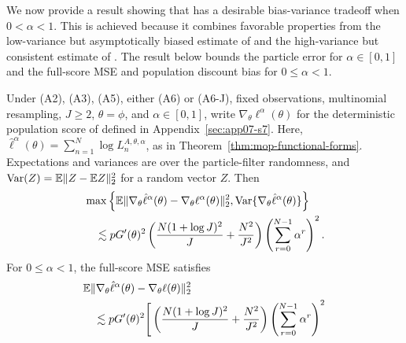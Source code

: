 
We now provide a result showing that  has a desirable bias-variance tradeoff when $0<\alpha<1$.
This is achieved because it combines favorable properties from the low-variance but asymptotically biased estimate of \cite{naesseth18} and the high-variance but consistent estimate of \cite{poyiadjis11}. 
\begingroup
The result below bounds the particle error for $\alpha\in[0,1]$ and the full-score MSE and population discount bias for $0\leq\alpha<1$.
\par\endgroup

\begingroup
\begin{thm}
\label{thm:mop-biasvar}
Under (A2), (A3), (A5), either (A6) or (A6-J), fixed observations,
multinomial resampling, $J\geq2$, $\theta=\phi$, and
$\alpha\in[0,1]$, write $\nabla_\theta\ell^\alpha(\theta)$ for the
deterministic population score of  defined in Appendix~\ref{sec:app07-s7}.
Here, $\hat\ell^\alpha(\theta)=\sum_{n=1}^N\log L_n^{A,\theta,\alpha}$,
as in Theorem~\ref{thm:mop-functional-forms}. Expectations and variances are over
the particle-filter randomness, and
$\mathrm{Var}(Z)=\mathbb{E}\|Z-\mathbb{E} Z\|_2^2$ for a random vector $Z$. Then
\begin{equation}
\label{eq:mop-variance}
\begin{aligned}
&\max\left\{
\mathbb{E}\|\nabla_\theta\hat\ell^\alpha(\theta)
-\nabla_\theta\ell^\alpha(\theta)\|_2^2,
\mathrm{Var}\{\nabla_\theta\hat\ell^\alpha(\theta)\}
\right\}
\\
&\quad\lesssim
pG'(\theta)^2
\left(\frac{N(1+\log J)^2}{J}+\frac{N^2}{J^2}\right)
\left(\sum_{r=0}^{N-1}\alpha^r\right)^2.
\end{aligned}
\end{equation}
For $0\leq\alpha<1$, the full-score MSE satisfies
\begin{equation}
\label{eq:mop-mse}
\begin{aligned}
&\E\|\nabla_\theta\hat\ell^\alpha(\theta)
-\nabla_\theta\ell(\theta)\|_2^2\\
&\quad\lesssim pG'(\theta)^2
\begin{aligned}[t]
\Bigg[&
\left(\frac{N(1+\log J)^2}{J}+\frac{N^2}{J^2}\right)
\left(\sum_{r=0}^{N-1}\alpha^r\right)^2\\

\end{aligned}
\end{aligned}
\end{equation}
\end{thm}
